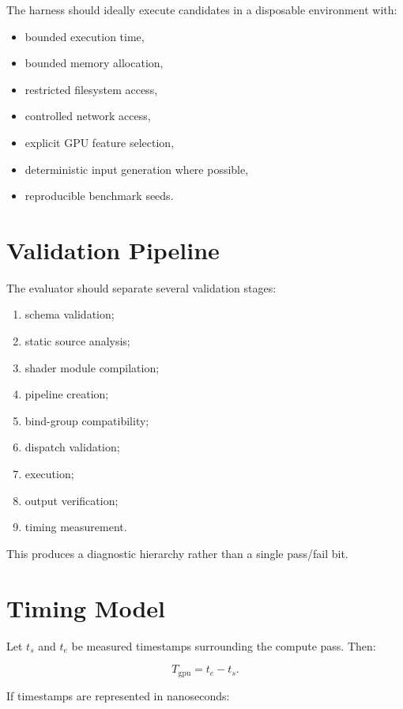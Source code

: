 \documentclass[11pt,a4paper,oneside]{report}
\begin{document}
The harness should ideally execute candidates in a disposable environment with:

\begin{itemize}
  \item bounded execution time,
  \item bounded memory allocation,
  \item restricted filesystem access,
  \item controlled network access,
  \item explicit GPU feature selection,
  \item deterministic input generation where possible,
  \item reproducible benchmark seeds.
\end{itemize}

\section{Validation Pipeline}

The evaluator should separate several validation stages:

\begin{enumerate}
  \item schema validation;
  \item static source analysis;
  \item shader module compilation;
  \item pipeline creation;
  \item bind-group compatibility;
  \item dispatch validation;
  \item execution;
  \item output verification;
  \item timing measurement.
\end{enumerate}

This produces a diagnostic hierarchy rather than a single pass/fail bit.

\section{Timing Model}

Let $t_s$ and $t_e$ be measured timestamps surrounding the compute pass. Then:

\begin{equation}
T_{\mathrm{gpu}}=t_e-t_s.
\end{equation}

If timestamps are represented in nanoseconds:
\end{document}
